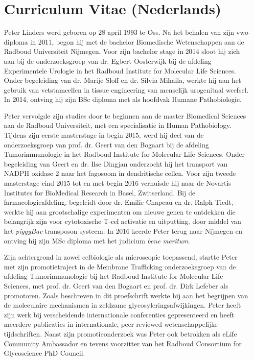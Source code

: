 \clearpage

\section{Curriculum Vitae (Nederlands)}

Peter Linders werd geboren op 28 april 1993 te Oss. Na het behalen van zijn vwo-diploma in 2011, begon hij met de bachelor Biomedische Wetenschappen aan de Radboud Universiteit Nijmegen. Voor zijn bachelor stage in 2014 sloot hij zich aan bij de onderzoeksgroep van dr. Egbert Oosterwijk bij de afdeling Experimentele Urologie in het Radboud Institute for Molecular Life Sciences. Onder begeleiding van dr. Marije Sloff en dr. Silvia Mihaila, werkte hij aan het gebruik van vetstamcellen in tissue engineering van menselijk urogenitaal weefsel. In 2014, ontving hij zijn BSc diploma met als hoofdvak Humane Pathobiologie.

Peter vervolgde zijn studies door te beginnen aan de master Biomedical Sciences aan de Radboud Universiteit, met een specialisatie in Human Pathobiology. Tijdens zijn eerste masterstage in begin 2015, werd hij deel van de onderzoeksgroep van prof. dr. Geert van den Bogaart bij de afdeling Tumorimmunologie in het Radboud Institute for Molecular Life Sciences. Onder begeleiding van Geert en dr. Ilse Dingjan onderzocht hij het transport van NADPH oxidase 2 naar het fagosoom in dendritische cellen. Voor zijn tweede masterstage eind 2015 tot en met begin 2016 verhuisde hij naar de Novartis Institutes for BioMedical Research in Basel, Zwitserland. Bij de farmacologieafdeling, begeleidt door dr. Emilie Chapeau en dr. Ralph Tiedt, werkte hij aan grootschalige experimenten om nieuwe genen te ontdekken die belangrijk zijn voor cytotoxische T-cel activatie en uitputting, door middel van het \emph{piggyBac} transposon systeem. In 2016 keerde Peter terug naar Nijmegen en ontving hij zijn MSc diploma met het judicium \emph{bene meritum}.

Zijn achtergrond in zowel celbiologie als microscopie toepassend, startte Peter met zijn promotietraject in de Membrane Trafficking onderzoeksgroep van de afdeling Tumorimmunologie bij het Radboud Institute for Molecular Life Sciences, met prof. dr. Geert van den Bogaart en prof. dr. Dirk Lefeber als promotoren. Zoals beschreven in dit proefschrift werkte hij aan het begrijpen van de moleculaire mechanismen in zeldzame glycosyleringsafwijkingen. Peter heeft zijn werk bij verscheidende internationale conferenties gepresenteerd en heeft meerdere publicaties in internationale, peer-reviewed wetenschappelijke tijdschriften. Naast zijn promotieonderzoek was Peter ook betrokken als eLife Community Ambassador en tevens voorzitter van het Radboud Consortium for Glycoscience PhD Council.


